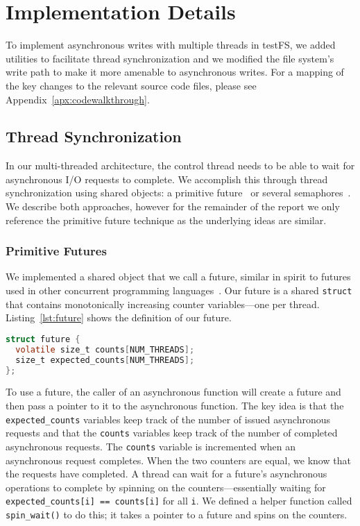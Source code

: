 \section{Implementation Details}
To implement asynchronous writes with multiple threads in testFS, we added
utilities to facilitate thread synchronization and we modified the file
system's write path to make it more amenable to asynchronous writes. For a
mapping of the key changes to the relevant source code files, please see
Appendix~\ref{apx:codewalkthrough}.

\subsection{Thread Synchronization}\label{sec:threadsync}
In our multi-threaded architecture, the control thread needs to be able to wait
for asynchronous I/O requests to complete. We accomplish this through thread
synchronization using shared objects: a primitive
future~\cite{futures-halstead85} or several
semaphores~\cite{semaphores-dijkstra65}. We describe both approaches, however
for the remainder of the report we only reference the primitive future
technique as the underlying ideas are similar.

\subsubsection{Primitive Futures}\label{sec:futures}
We implemented a shared object that we call a future, similar in spirit to
futures used in other concurrent programming
languages~\cite{futures-halstead85}. Our future is a shared {\tt struct} that
contains monotonically increasing counter variables---one per thread.
Listing~\ref{lst:future} shows the definition of our future.

\begin{lstlisting}[language=C,
  caption={Our primitive future},
  captionpos=b,
  label={lst:future}]
struct future {
  volatile size_t counts[NUM_THREADS];
  size_t expected_counts[NUM_THREADS];
};
\end{lstlisting}

To use a future, the caller of an asynchronous function will create a future
and then pass a pointer to it to the asynchronous function. The key idea is
that the {\tt expected\_counts} variables keep track of the number of issued
asynchronous requests and that the {\tt counts} variables keep track of the
number of completed asynchronous requests. The {\tt counts} variable is
incremented when an asynchronous request completes. When the two counters are
equal, we know that the requests have completed. A thread can wait for a
future's asynchronous operations to complete by spinning on the
counters---essentially waiting for {\tt expected\_counts[i] == counts[i]} for
all {\tt i}. We defined a helper function called {\tt spin\_wait()} to do this;
it takes a pointer to a future and spins on the counters.


